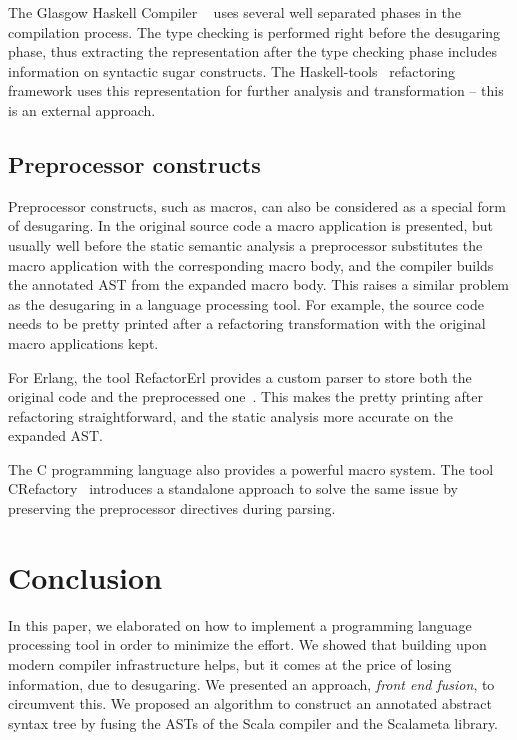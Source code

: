 \documentclass[11pt]{amsart}
\begin{document}
The Glasgow Haskell Compiler ~\cite{aosaghc} uses several well
separated phases in the compilation process. The type checking is
performed right before the desugaring phase, thus extracting the
representation after the type checking phase includes information on
syntactic sugar constructs. The Haskell-tools~\cite{haskelltools}
refactoring framework uses this representation for further analysis and
transformation -- this is an external approach.

\subsection{Preprocessor constructs}
Preprocessor constructs, such as macros, can also be considered as a
special form of desugaring. In the original source code a macro
application is presented, but usually well before the static semantic
analysis a preprocessor substitutes the macro application with the
corresponding macro body, and the compiler builds the annotated AST
from the expanded macro body. This raises a similar problem as the
desugaring in a language processing tool. For example, the source code
needs to be pretty printed after a refactoring transformation with 
the original macro applications kept.

For Erlang, the tool RefactorErl provides a custom
parser to store both the original code and the
preprocessed one~\cite{kitlei,erlws10}. This makes the pretty printing after refactoring
straightforward, and the static analysis more accurate on the expanded
AST.

The C programming language also provides a powerful macro system. The
tool CRefactory~\cite{cpreproc} introduces a standalone approach to
solve the same issue by preserving the preprocessor directives during parsing.



\section{Conclusion}
\label{sec:concl}
In this paper, we elaborated on how to implement a programming
language processing tool in order to minimize the effort. We showed
that building upon modern compiler infrastructure helps, but it comes
at the price of losing information, due to desugaring. We presented
an approach, \emph{front end fusion}, to circumvent this. We proposed
an algorithm to construct an annotated abstract syntax tree by fusing
the ASTs of the Scala compiler and the Scalameta library.
\end{document}
